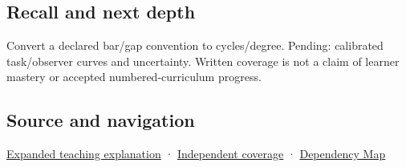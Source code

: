\subsection{Recall and next depth}\label{appendix-b491fc48c54b-recall-and-next-depth}

Convert a declared bar/gap convention to cycles/degree. Pending: calibrated task/observer curves and uncertainty. Written coverage is not a claim of learner mastery or accepted numbered-curriculum progress.

\subsection{Source and navigation}\label{appendix-b491fc48c54b-source-and-navigation}

\hyperref[04-visual-computing-ii-ch042-visibility-is-about-contrast-conditions-and-tasks]{Expanded teaching explanation} · \hyperref[appendix-fd090d982a15-xr01---independent-seeing-and-representation-source]{Independent coverage} · \hyperref[appendix-4ad47bdd269a]{Dependency Map}
